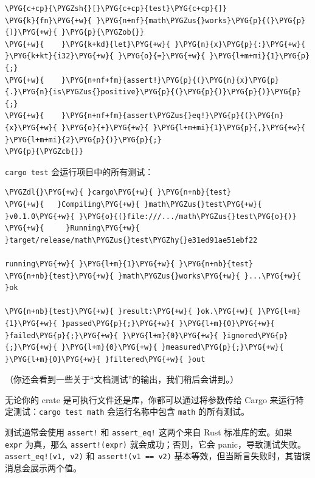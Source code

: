 \begin{Verbatim}[commandchars=\\\{\},breaklines=true,breakanywhere=true,fontsize=\codefont,xleftmargin=17bp]
\PYG{c+cp}{\PYGZsh{}[}\PYG{c+cp}{test}\PYG{c+cp}{]}
\PYG{k}{fn}\PYG{+w}{ }\PYG{n+nf}{math\PYGZus{}works}\PYG{p}{(}\PYG{p}{)}\PYG{+w}{ }\PYG{p}{\PYGZob{}}
\PYG{+w}{    }\PYG{k+kd}{let}\PYG{+w}{ }\PYG{n}{x}\PYG{p}{:}\PYG{+w}{ }\PYG{k+kt}{i32}\PYG{+w}{ }\PYG{o}{=}\PYG{+w}{ }\PYG{l+m+mi}{1}\PYG{p}{;}
\PYG{+w}{    }\PYG{n+nf+fm}{assert!}\PYG{p}{(}\PYG{n}{x}\PYG{p}{.}\PYG{n}{is\PYGZus{}positive}\PYG{p}{(}\PYG{p}{)}\PYG{p}{)}\PYG{p}{;}
\PYG{+w}{    }\PYG{n+nf+fm}{assert\PYGZus{}eq!}\PYG{p}{(}\PYG{n}{x}\PYG{+w}{ }\PYG{o}{+}\PYG{+w}{ }\PYG{l+m+mi}{1}\PYG{p}{,}\PYG{+w}{ }\PYG{l+m+mi}{2}\PYG{p}{)}\PYG{p}{;}
\PYG{p}{\PYGZcb{}}
\end{Verbatim}

\texttt{cargo test} 会运行项目中的所有测试：

\begin{Verbatim}[commandchars=\\\{\},breaklines=true,breakanywhere=true,fontsize=\codefont,xleftmargin=17bp]
\PYGZdl{}\PYG{+w}{ }cargo\PYG{+w}{ }\PYG{n+nb}{test}
\PYG{+w}{   }Compiling\PYG{+w}{ }math\PYGZus{}test\PYG{+w}{ }v0.1.0\PYG{+w}{ }\PYG{o}{(}file:///.../math\PYGZus{}test\PYG{o}{)}
\PYG{+w}{     }Running\PYG{+w}{ }target/release/math\PYGZus{}test\PYGZhy{}e31ed91ae51ebf22

running\PYG{+w}{ }\PYG{l+m}{1}\PYG{+w}{ }\PYG{n+nb}{test}
\PYG{n+nb}{test}\PYG{+w}{ }math\PYGZus{}works\PYG{+w}{ }...\PYG{+w}{ }ok

\PYG{n+nb}{test}\PYG{+w}{ }result:\PYG{+w}{ }ok.\PYG{+w}{ }\PYG{l+m}{1}\PYG{+w}{ }passed\PYG{p}{;}\PYG{+w}{ }\PYG{l+m}{0}\PYG{+w}{ }failed\PYG{p}{;}\PYG{+w}{ }\PYG{l+m}{0}\PYG{+w}{ }ignored\PYG{p}{;}\PYG{+w}{ }\PYG{l+m}{0}\PYG{+w}{ }measured\PYG{p}{;}\PYG{+w}{ }\PYG{l+m}{0}\PYG{+w}{ }filtered\PYG{+w}{ }out
\end{Verbatim}

（你还会看到一些关于“文档测试”的输出，我们稍后会讲到。）

无论你的 crate 是可执行文件还是库，你都可以通过将参数传给 Cargo 来运行特定测试：\texttt{cargo test math} 会运行名称中包含 \texttt{math} 的所有测试。

测试通常会使用 \texttt{assert!} 和 \texttt{assert\_eq!} 这两个来自 Rust 标准库的宏。如果 \texttt{expr} 为真，那么 \texttt{assert!(expr)} 就会成功；否则，它会 panic，导致测试失败。\texttt{assert\_eq!(v1, v2)} 和 \texttt{assert!(v1 == v2)} 基本等效，但当断言失败时，其错误消息会展示两个值。

